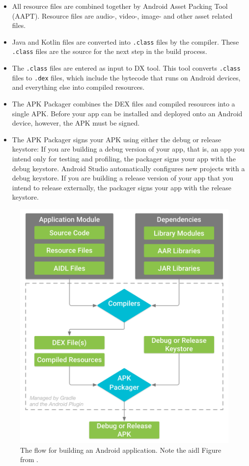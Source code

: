 \begin{itemize}
	\item All resource files are combined together by Android Asset Packing Tool (AAPT).
	Resource files are audio-, video-, image-  and other asset related files.
	\item Java and Kotlin files are converted into \texttt{.class} files by the compiler.
	These \texttt{.class} files are the source for the next step in the build process.
	\item The \texttt{.class}  files are entered as input to DX tool.
	This tool converts \texttt{.class} files to \texttt{.dex} files, which include the bytecode that runs on Android devices, and everything else into compiled resources.
	\item The APK Packager combines the DEX files and compiled resources into a single APK.
	Before your app can be installed and deployed onto an Android device, however, the APK must be signed.
	\item The APK Packager signs your APK using either the debug or release keystore:
	If you are building a debug version of your app, that is, an app you intend only for testing and profiling, the packager signs your app with the debug keystore.
	Android Studio automatically configures new projects with a debug keystore.
	If you are building a release version of your app that you intend to release externally, the packager signs your app with the release keystore.
\end{itemize}


\begin{figure}[hb]
	\includegraphics[width=\textwidth]{images/hello/development.png}
	\caption{The flow for building an Android application.
		Note the \gls{aidl} Figure from \cite{Developers2018build}.}
	\label{fig:develop}
\end{figure}

